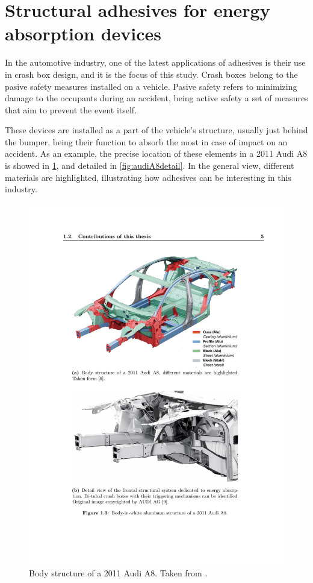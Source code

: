 \documentclass[
documentsize = a4, %
font = cmr, %
typesize = 11, %
printmode = true,
onehalfspacing = true,
language = en, %
titlepage = udciccp, %
degree = pt, %
dedication = true,
acknowledgements = true,
abstract-en = true,
abstract-es = false,
abstract-ga = false,
epigraphs = true,
toc = true,
lof = true,
lot = true,
frontmatterintoc = false,
notation = false,
minimal = false,
]{UDCthesis}
\begin{document}
\section{Structural adhesives for energy absorption devices}
In the automotive industry, one of the latest applications of adhesives is their use in crash box design, and it is the focus of this study. Crash boxes belong to the pasive safety measures installed on a vehicle. Pasive safety refers to minimizing damage to the occupants during an accident, being active safety a set of measures that aim to prevent the event itself.

These devices are installed as a part of the vehicle's structure, usually just behind the bumper, being their function to absorb the most in case of impact on an accident. As an example, the precise location of these elements in a 2011 Audi A8 is showed in \cref{fig:audiA8struc}, and detailed in \cref{fig:audiA8detail}. In the general view, different materials are highlighted, illustrating how adhesives can be interesting in this industry.

\begin{figure}
	\centering
	\includegraphics[width=0.65\linewidth]{IMG_CUTRES/audiA8struc}
	\caption[Body structure of a 2011 Audi A8.]{Body structure of a 2011 Audi A8. Taken from \citep{audiA8}.}
	\label{fig:audiA8struc}
\end{figure}
\end{document}
